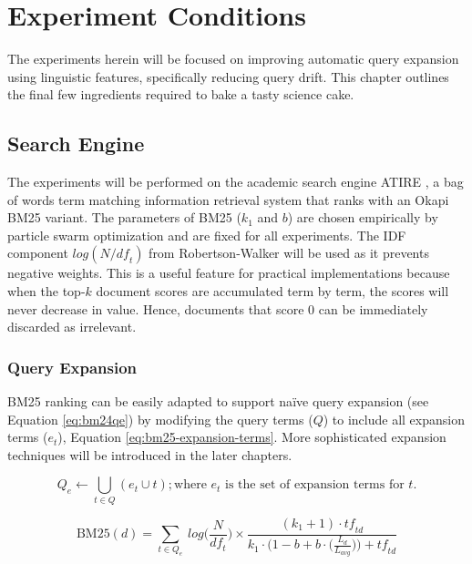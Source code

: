 \chapter{Experiment Conditions}
\label{chap:experiment-conditions}

The experiments herein will be focused on improving automatic query expansion using linguistic features, specifically reducing query drift. This chapter outlines the final few ingredients required to bake a tasty science cake.

\section{Search Engine}
The experiments will be performed on the academic search engine ATIRE \cite{Trotman:2012:OSI:2422256.2422269}, a bag of words term matching information retrieval system that ranks with an Okapi BM25 variant. The parameters of BM25 ($k_1$ and $b$) are chosen empirically by particle swarm optimization \cite{Trotman:2014:IBL:2682862.2682863} and are fixed for all experiments. The IDF component $log ({N} / {\mathit{df}_{\!\!t}} )$ from Robertson-Walker \cite{Lee:2007:IRS:1277741.1277891} will be used as it prevents negative weights. This is a useful feature for practical implementations because when the top-$k$ document scores are accumulated term by term, the scores will never decrease in value. Hence, documents that score 0 can be immediately discarded as irrelevant.

\subsection{Query Expansion}
BM25 ranking can be easily adapted to support na{\"i}ve query expansion (see Equation \ref{eq:bm24qe}) by modifying the query terms ($Q$) to include all expansion terms ($e_t$), Equation \ref{eq:bm25-expansion-terms}. More sophisticated expansion techniques will be introduced in the later chapters.

\begin{equation}
	Q_{e} \leftarrow \bigcup_{t \in Q} ( e_t \cup t ) ; \text{where } e_t \text{ is the set of expansion terms for } t.
	\label{eq:bm25-expansion-terms}
\end{equation}


\begin{equation}
	\text{BM25}(d) = \sum_{t \in Q_{e}} \: log \Big( \frac{N}{\mathit{df}_{\!\!t}} \Big) \times \frac{(k_1 + 1) \cdot \mathit{tf}_{\!\!td}}{k_1 \cdot \Big(1-b + b \cdot \Big(\frac{L_d}{L_{avg}}\Big) \Big) + \mathit{tf}_{\!\!td}}
	\label{eq:bm24qe}
\end{equation}

